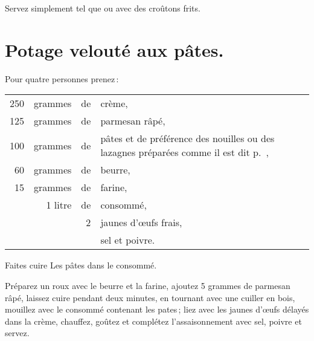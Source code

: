 Servez simplement tel que ou avec des croûtons frits.

\section*{\centering Potage velouté aux pâtes.}

Pour quatre personnes prenez :

\medskip

\footnotesize
\begin{longtable}{rrrp{16em}}                                                    
    250 & grammes     & de & crème,                                                                       \\
    125 & grammes     & de & parmesan râpé,                                                               \\
    100 & grammes     & de & pâtes et de préférence des nouilles ou des lazagnes                          
                             préparées comme il est dit p. \hyperlink{p0680}{\pageref{pg0680}},           \\
     60 & grammes     & de & beurre,                                                                      \\
     15 & grammes     & de & farine,                                                                      \\
        & 1 litre     & de & consommé,                                                                    \\
        &             & 2  & jaunes d'œufs frais,                                                         \\
        &             &    & sel et poivre.                                                               \\
\end{longtable}
\normalsize
                                                 
Faites cuire Les pâtes dans le consommé.

Préparez un roux avec le beurre et la farine, ajoutez 5 grammes de parmesan
râpé, laissez cuire pendant deux minutes, en tournant avec une cuiller en bois,
mouillez avec le consommé contenant les pates ; liez avec les jaunes d'œufs
délayés dans la crème, chauffez, goûtez et complétez l'assaisonnement avec sel,
poivre et servez.

